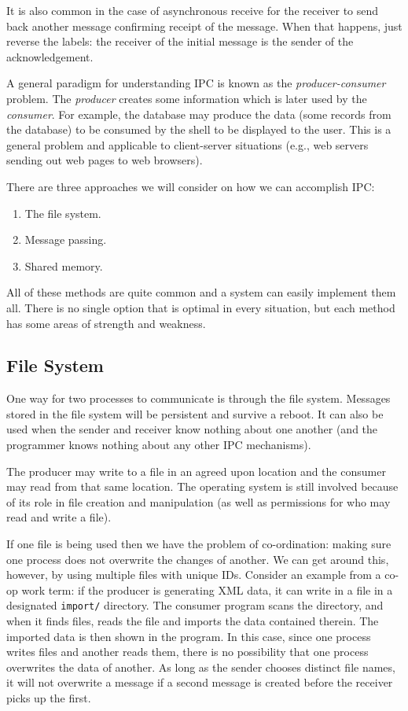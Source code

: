 \documentclass[a4paper]{report}
\begin{document}
It is also common in the case of asynchronous receive for the receiver to send back another message confirming receipt of the message. When that happens, just reverse the labels: the receiver of the initial message is the sender of the acknowledgement.

A general paradigm for understanding IPC is known as the \textit{producer-consumer} problem. The \textit{producer} creates some information which is later used by the \textit{consumer}. For example, the database may produce the data (some records from the database) to be consumed by the shell to be displayed to the user. This is a general problem and applicable to client-server situations (e.g., web servers sending out web pages to web browsers).

There are three approaches we will consider on how we can accomplish IPC:
\begin{enumerate}
	\item The file system.
	\item Message passing.
	\item Shared memory.
\end{enumerate}

All of these methods are quite common and a system can easily implement them all. There is no single option that is optimal in every situation, but each method has some areas of strength and weakness.

\subsection*{File System}

One way for two processes to communicate is through the file system. Messages stored in the file system will be persistent and survive a reboot. It can also be used when the sender and receiver know nothing about one another (and the programmer knows nothing about any other IPC mechanisms).

The producer may write to a file in an agreed upon location and the consumer may read from that same location. The operating system is still involved because of its role in file creation and manipulation (as well as permissions for who may read and write a file).

If one file is being used then we have the problem of co-ordination: making sure one process does not overwrite the changes of another. We can get around this, however, by using multiple files with unique IDs. Consider an example from a co-op work term: if the producer is generating XML data, it can write in a file in a designated \texttt{import/} directory. The consumer program scans the directory, and when it finds files, reads the file and imports the data contained therein. The imported data is then shown in the program. In this case, since one process writes files and another reads them, there is no possibility that one process overwrites the data of another. As long as the sender chooses distinct file names, it will not overwrite a message if a second message is created before the receiver picks up the first.
\end{document}
